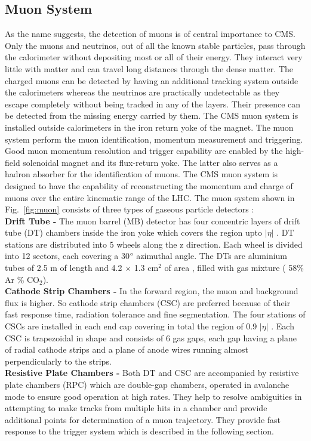 \subsection{Muon System}
As the name suggests, the detection of muons is of central importance to CMS. Only the muons and neutrinos, out of all the known stable particles, pass through the calorimeter without depositing most or all of their energy. They interact very little with matter and can travel long distances through the dense matter. The charged muons can be detected by having an additional tracking system outside the calorimeters whereas the neutrinos are practically undetectable as they escape completely without being tracked in any of the layers. Their presence can be detected from the missing energy carried by them. The CMS muon system is installed outside calorimeters in the iron return yoke of the magnet. The muon system perform the muon identification, momentum measurement and triggering. Good muon momentum resolution and trigger capability are enabled by the high-field solenoidal magnet and its flux-return yoke. The latter also serves as a hadron absorber for the identification of muons. The CMS muon system is designed to have the capability of reconstructing the momentum and charge of muons over the entire kinematic range of the LHC. The muon system shown in Fig.~\ref{fig:muon} consists of three types of gaseous particle detectors : \\ \newline 
{\bf Drift Tube -} 
The muon barrel (MB) detector has four concentric layers of drift tube (DT) chambers inside the iron yoke which covers the region upto $|\eta|$ . DT stations are distributed into 5 wheels along the z direction. Each wheel is divided into 12 sectors, each covering a 30$\degree$ azimuthal angle. The DTs are aluminium tubes of 2.5 m of length and 4.2 $\times$ 1.3 cm$^{2}$ of area , filled with gas mixture ( 58\% Ar  \% CO$_{2}$). \\ \newline
{\bf Cathode Strip Chambers -} In the forward region, the muon and background flux is higher. So cathode strip chambers (CSC) are preferred because of their fast response time, radiation tolerance and fine segmentation. The four stations of CSCs are installed in each end cap covering in total the region of 0.9 \ls $|\eta|$ . Each CSC is trapezoidal in shape and consists of 6 gas gaps, each gap having a plane of radial cathode strips and a plane of anode wires running almost perpendicularly to the strips. \\ \newline
{\bf Resistive Plate Chambers -} Both DT and CSC are accompanied by resistive plate chambers (RPC) which are double-gap chambers, operated in avalanche mode to ensure good operation at high rates. They help to resolve ambiguities in attempting to make tracks from multiple hits in a chamber and provide additional points for determination of a muon trajectory. They provide fast response to the trigger system which is described in the following section.
 
